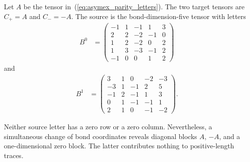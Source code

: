 \begin{definition}
    \label{def:asymex_parity}
    \leanok
    Let $A$ be the tensor in~(\ref{eq:asymex_parity_letters}).
    The two target tensors are $C_+=A$ and $C_-=-A$.
    The source is the bond-dimension-five tensor with letters
    \begin{align}
        B^0
         & =\begin{pmatrix}
                -1 & 1 & -1 & 1  & 3 \\
                2  & 2 & -2 & -1 & 0 \\
                1  & 2 & -2 & 0  & 2 \\
                1  & 3 & -3 & -1 & 2 \\
                -1 & 0 & 0  & 1  & 2
            \end{pmatrix}
        \label{eq:asymex_parity_source_zero}
    \end{align}
    and
    \begin{align}
        B^1
         & =\begin{pmatrix}
                3  & 1 & 0  & -2 & -3 \\
                -3 & 1 & -1 & 2  & 5  \\
                -1 & 2 & -1 & 1  & 3  \\
                0  & 1 & -1 & -1 & 1  \\
                2  & 1 & 0  & -1 & -2
            \end{pmatrix}.
        \label{eq:asymex_parity_source_one}
    \end{align}
\end{definition}

Neither source letter has a zero row or a zero column. Nevertheless,
a simultaneous change of bond coordinates reveals diagonal blocks
$A$, $-A$, and a one-dimensional zero block. The latter contributes
nothing to positive-length traces.

